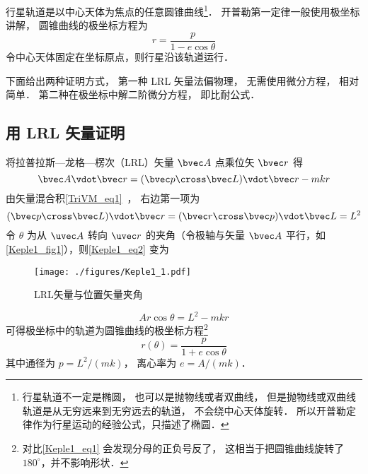 

行星轨道是以中心天体为焦点的任意圆锥曲线\footnote{行星轨道不一定是椭圆， 也可以是抛物线或者双曲线， 但是抛物线或双曲线轨道是从无穷远来到无穷远去的轨道， 不会绕中心天体旋转． 所以开普勒定律作为行星运动的经验公式，只描述了椭圆．}． 开普勒第一定律一般使用极坐标讲解， 圆锥曲线的极坐标方程为
\begin{equation}\label{Keple1_eq1}
r = \frac{p}{1 - e \cos \theta }
\end{equation}
令中心天体固定在坐标原点，则行星沿该轨道运行．

下面给出两种证明方式， 第一种 LRL 矢量法偏物理， 无需使用微分方程， 相对简单． 第二种在极坐标中解二阶微分方程， 即比耐公式．

\subsection{用 LRL 矢量证明}

将拉普拉斯—龙格—楞次（LRL）矢量 $\bvec A$ 点乘位矢 $\bvec r$ 得
\begin{equation}\label{Keple1_eq2}
\bvec A \vdot \bvec r = (\bvec p \cross \bvec L)\vdot \bvec r - mkr
\end{equation}
由矢量混合积\autoref{TriVM_eq1}~， 右边第一项为
\begin{equation}
(\bvec p \cross \bvec L)\vdot \bvec r = (\bvec r \cross \bvec p)\vdot \bvec L = L^2
\end{equation}
令 $\theta$ 为从 $\uvec A$ 转向 $\uvec r$ 的夹角（令极轴与矢量 $\bvec A$ 平行，如\autoref{Keple1_fig1}），则\autoref{Keple1_eq2} 变为
\begin{figure}[ht]
\centering
\texttt{[image: ./figures/Keple1\_1.pdf]}
\caption{LRL矢量与位置矢量夹角} \label{Keple1_fig1}
\end{figure}
\begin{equation}
Ar\cos\theta = L^2 - mkr
\end{equation}
可得极坐标中的轨道为圆锥曲线的极坐标方程\footnote{对比\autoref{Keple1_eq1} 会发现分母的正负号反了， 这相当于把圆锥曲线旋转了 $180^\circ$，并不影响形状．}
\begin{equation}
r(\theta) = \frac{p}{1 + e\cos\theta}
\end{equation}
其中通径为 $p = L^2/(mk)$， 离心率为 $e = A/(mk)$．

